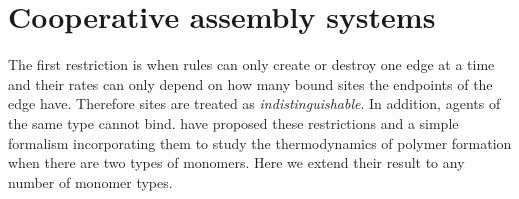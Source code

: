 \section{Cooperative assembly systems}
\label{sec:cas}

The first restriction is when
rules can only create or destroy one edge at a time
and their rates can only depend on
how many bound sites the endpoints of the edge have.
Therefore sites are treated as \emph{indistinguishable}.
In addition, agents of the same type cannot bind.
\citet{cas} have proposed these restrictions
and a simple formalism incorporating them
to study the thermodynamics of polymer formation
when there are two types of monomers.
Here we extend their result to any number of monomer types.

